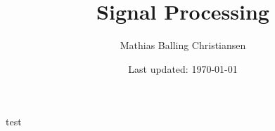 \documentclass{article}
\title{Signal Processing}
\author{Mathias Balling Christiansen}
\date{Last updated: \today}
\begin{document}
\maketitle
\tableofcontents
test
% 
% 
\end{document}
